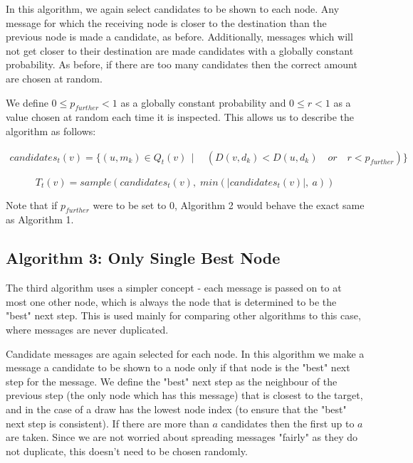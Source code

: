 \documentclass[bsc,frontabs,twoside,singlespacing,parskip,deptreport]{infthesis}     %
\begin{document}
In this algorithm, we again select candidates to be shown to each node. Any message for which the receiving node is closer to the destination than the previous node is made a candidate, as before. Additionally, messages which will not get closer to their destination are made candidates with a globally constant probability. As before, if there are too many candidates then the correct amount are chosen at random.

We define $0 \leq p_{further} < 1$ as a globally constant probability and $0 \leq r < 1$ as a value chosen at random each time it is inspected. This allows us to describe the algorithm as follows:

\begin{equation}
\begin{split}
candidates_{t}(v) = \{ (u, m_{k}) \in Q_{t}(v) \:\: | \:\: & (D(v, d_{k}) < D(u, d_{k}) \quad or \quad r < p_{further}) \}
\end{split}
\end{equation}

\begin{equation}
T_{t}(v) = sample(candidates_{t}(v), \; min(|candidates_{t}(v)|, \: a))
\end{equation}

Note that if $p_{further}$ were to be set to 0, Algorithm 2 would behave the exact same as Algorithm 1.

\subsection{Algorithm 3: Only Single Best Node}
The third algorithm uses a simpler concept - each message is passed on to at most one other node, which is always the node that is determined to be the "best" next step. This is used mainly for comparing other algorithms to this case, where messages are never duplicated.

Candidate messages are again selected for each node. In this algorithm we make a message a candidate to be shown to a node only if that node is the "best" next step for the message. We define the "best" next step as the neighbour of the previous step (the only node which has this message) that is closest to the target, and in the case of a draw has the lowest node index (to ensure that the "best" next step is consistent). If there are more than $a$ candidates then the first up to $a$ are taken. Since we are not worried about spreading messages "fairly" as they do not duplicate, this doesn't need to be chosen randomly. 
\end{document}
